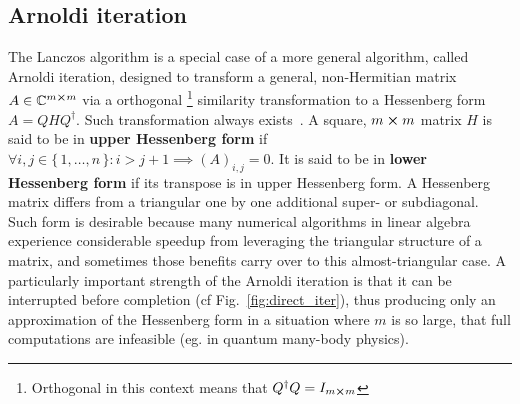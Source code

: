 \subsection{Arnoldi iteration}
The Lanczos algorithm is a special case of a more general algorithm, called Arnoldi iteration, designed to transform
a general, non-Hermitian matrix \(A\in \mathbb{C}^{m\cross m} \) via a orthogonal
\footnote{Orthogonal in this context means that \(Q^{\dagger}Q = I_{m \cross m}\)} similarity transformation to a Hessenberg form \(A = QHQ^{\dagger}\).
Such transformation always exists~\autocite {Garcia2017}. A square, \(m \cross m\) matrix \(H\) is said to be
in \textbf{upper Hessenberg form} if \(\forall i,j\in \{\,1,\ldots,n\,\}: i > j+1 \implies (A)_{i,j}=0 \).
It is said to be in \textbf{lower Hessenberg form} if its transpose is in upper Hessenberg form.
A Hessenberg matrix differs from a triangular one by one additional super- or subdiagonal.
Such form is desirable because many numerical algorithms in linear algebra experience considerable speedup
from leveraging the triangular structure of a matrix, and sometimes those benefits carry over to this almost-triangular
case. A particularly important strength of the Arnoldi iteration is that it can be interrupted before completion (cf Fig.~\ref{fig:direct_iter}),
thus producing only an approximation of the Hessenberg form in a situation where \(m\) is so large, that
full computations are infeasible (eg. in quantum many-body physics).

